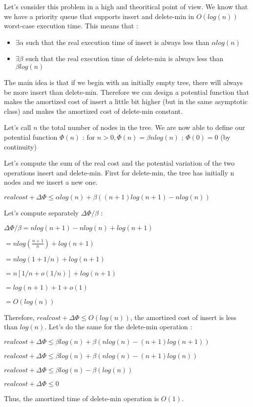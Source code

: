 
Let's consider this problem in a high and theoritical point of view. We know that we have a priority queue that supports insert and delete-min in $O(log(n))$ worst-case execution time. This means that :
\begin{itemize}
	\item $\exists \alpha$ such that the real execution time of insert is always less than $\alpha log(n)$
	\item $\exists \beta$ such that the real execution time of delete-min is always less than $\beta log(n)$
\end{itemize}

The main idea is that if we begin with an initially empty tree, there will always be more insert than delete-min. Therefore we can design a potential function that makes the amortized cost of insert a little bit higher (but in the same asymptotic class) and makes the amortized cost of delete-min constant.

Let's call $n$ the total number of nodes in the tree. We are now able to define our potential function $\Phi(n)$ :
for $ n > 0, \Phi(n) = \beta n log(n)$ ; $\Phi(0) = 0 $ (by continuity)

\newline

Let's compute the sum of the real cost and the potential variation of the two operations insert and delete-min.
First for delete-min, the tree has initially n nodes and we insert a new one.

$real cost + \Delta\Phi \leqslant \alpha log(n) + \beta((n+1)log(n+1)-nlog(n))$

Let's compute separately $ \Delta\Phi / \beta $ :

$ \Delta\Phi / \beta  = n log(n+1) -n log(n) + log(n+1)$

$= n log(\frac{n+1}{n}) + log(n+1)$

$= n log(1+ 1/n) + log(n+1)$

$= n[1/n + o(1/n)] + log(n+1)$

$= log(n+1) +1 + o(1) $

$= O(log(n))$

Therefore, $real cost + \Delta\Phi \leqslant O(log(n))$, the amortized cost of insert is less than $log(n)$.
Let's do the same for the delete-min operation :

$real cost + \Delta\Phi \leqslant \beta log(n) + \beta(nlog(n)-(n+1)log(n+1))$

$real cost + \Delta\Phi \leqslant \beta log(n) + \beta(nlog(n)-(n+1)log(n))$

$real cost + \Delta\Phi \leqslant \beta log(n) - \beta(log(n))$

$real cost + \Delta\Phi \leqslant 0$

Thus, the amortized time of delete-min operation is $O(1)$.
